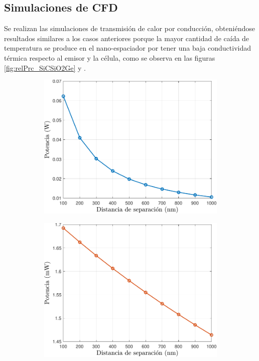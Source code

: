 \subsection{Simulaciones de CFD}
Se realizan las simulaciones de transmisión de calor por conducción, obteniéndose resultados similares a los casos anteriores porque la mayor cantidad de caída de temperatura se produce en el nano-espaciador por tener una baja conductividad térmica respecto al emisor y la célula, como se observa en las figuras \ref{fig:relPrc_SiCSiO2Ge}  y .
\graphicspath{ {./figuras/Resultados/conduccion/pdf/} }
\begin{figure}[H]
	\centering
	\begin{subfigure}[b]{0.49\textwidth}
		\centering
			\includegraphics[width=1.00\textwidth]{Pn_SiCSiO2Ge.pdf}
		\caption{ }
		\label{fig:Prc_SiCSiO2Ge}
	\end{subfigure}
	\hfill
	\begin{subfigure}[b]{0.49\textwidth}
		\centering
			\includegraphics[width=1.00\textwidth]{Prc_SiCSiO2Ge.pdf}

\end{subfigure}
\end{figure}
